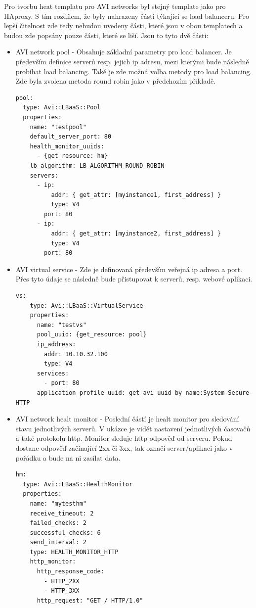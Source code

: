Pro tvorbu heat templatu pro AVI networks byl stejný template jako pro HAproxy. S tím rozdílem, že byly nahrazeny části týkající se load balanceru. Pro lepší čitelnost zde tedy nebudou uvedeny části, které jsou v obou templatech a budou zde popsány pouze části, které se liší. Jsou to tyto dvě části:

\begin{itemize}
\item AVI network pool - Obsahuje základní parametry pro load balancer. Je především definice serverů resp. jejich ip adresu, mezi kterými bude následně probíhat load balancing. Také je zde možná volba metody pro load balancing. Zde byla zvolena metoda round robin jako v předchozím příkladě. 

\begin{lstlisting}[caption=AVI networks pool]
pool:
  type: Avi::LBaaS::Pool
  properties:
    name: "testpool"
    default_server_port: 80
    health_monitor_uuids:
      - {get_resource: hm}
    lb_algorithm: LB_ALGORITHM_ROUND_ROBIN
    servers:
      - ip:
          addr: { get_attr: [myinstance1, first_address] }
          type: V4
        port: 80
      - ip:
          addr: { get_attr: [myinstance2, first_address] }
          type: V4
        port: 80
\end{lstlisting}

\item AVI virtual service - Zde je definovaná především veřejná ip adresa a port. Přes tyto údaje se následně bude přistupovat k serverů, resp. webové aplikaci.

\begin{lstlisting}[caption=AVI networks healt monitor]
  vs:
    type: Avi::LBaaS::VirtualService
    properties:
      name: "testvs"
      pool_uuid: {get_resource: pool}
      ip_address:
        addr: 10.10.32.100
        type: V4
      services:
        - port: 80
      application_profile_uuid: get_avi_uuid_by_name:System-Secure-HTTP
\end{lstlisting}


\item AVI network healt monitor - Poslední částí je healt monitor pro sledování stavu jednotlivých serverů. V ukázce je vidět nastavení jednotlivých časovačů a také protokolu http. Monitor sleduje http odpověď od serveru. Pokud dostane odpověď začínající 2xx či 3xx, tak označí server/aplikaci jako v pořádku a bude na ni zasílat data.

\begin{lstlisting}[caption=AVI networks virtual service]
hm:
  type: Avi::LBaaS::HealthMonitor
  properties:
    name: "mytesthm"
    receive_timeout: 2
    failed_checks: 2
    successful_checks: 6
    send_interval: 2
    type: HEALTH_MONITOR_HTTP
    http_monitor:
      http_response_code:
        - HTTP_2XX
        - HTTP_3XX
      http_request: "GET / HTTP/1.0"
\end{lstlisting}

\end{itemize}

